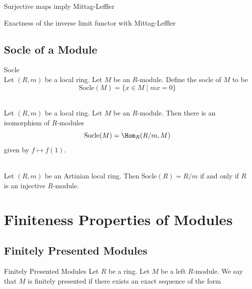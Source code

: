 \documentclass[a4paper]{article}
\begin{document}
\begin{lmm}{}{} Surjective maps imply Mittag-Leffler
\end{lmm}

\begin{prp}{}{} Exactness of the inverse limit functor with Mittag-Leffler
\end{prp}

\subsection{Socle of a Module}
\begin{defn}{Socle}{}\\
Let $(R,m)$ be a local ring. Let $M$ be an $R$-module. Define the socle of $M$ to be $$\text{Socle}(M)=\{x\in M\;|\;mx=0\}$$
\end{defn}

\begin{lmm}{}{}\\
Let $(R,m)$ be a local ring. Let $M$ be an $R$-module. Then there is an isomorphism of $R$-modules $$\text{Socle}(M)=\Hom_R(R/m,M)$$ given by $f\mapsto f(1)$. 
\end{lmm}

\begin{prp}{}{}\\
Let $(R,m)$ be an Artinian local ring. Then $\text{Socle}(R)=R/m$ if and only if $R$ is an injective $R$-module. 
\end{prp}

\pagebreak
\section{Finiteness Properties of Modules}
\subsection{Finitely Presented Modules}
\begin{defn}{Finitely Presented Modules}{} Let $R$ be a ring. Let $M$ be a left $R$-module. We say that $M$ is finitely presented if there exists an exact sequence of the form \\~\\
 \\
\end{defn}
\end{document}
